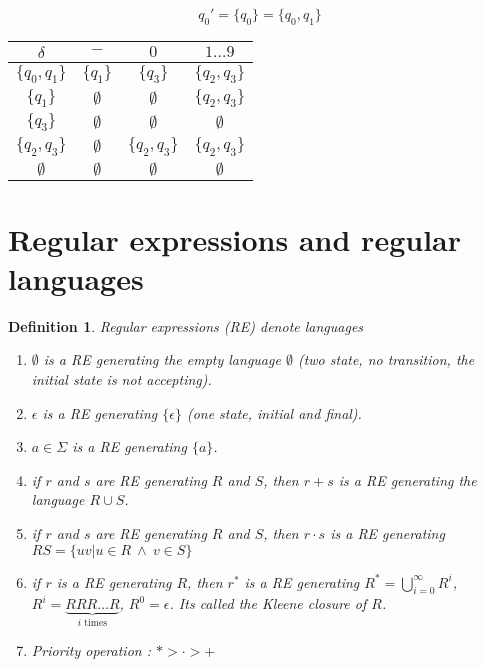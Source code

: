 \documentclass[a4paper,11pt]{article}
\newtheorem{mydef}{Definition}
\begin{document}
\begin{center}
\end{center}

\[
  q_0' = \{q_0\} = \{q_0,q_1\}
\]

\begin{center}
  \begin{tabular}{c|ccc}
    $\delta$      & $-$         & $0$           & $1 \dots 9$   \\ \hline
    $\{q_0,q_1\}$ & $\{q_1\}$   & $\{q_3\}$     & $\{q_2,q_3\}$ \\
    $\{q_1\}$     & $\emptyset$ & $\emptyset$   & $\{q_2,q_3\}$ \\
    $\{q_3\}$     & $\emptyset$ & $\emptyset$   & $\emptyset$   \\
    $\{q_2,q_3\}$ & $\emptyset$ & $\{q_2,q_3\}$ & $\{q_2,q_3\}$ \\
    $\emptyset$   & $\emptyset$ & $\emptyset$   & $\emptyset$  
  \end{tabular}
\end{center}

\section{Regular expressions and regular languages}

\begin{mydef}
  Regular expressions (RE) denote languages
  \begin{enumerate}
  \item $\emptyset$ is a RE generating the empty language $\emptyset$ (two
    state, no transition, the initial state is not accepting).
  \item $\epsilon$ is a RE generating $\{\epsilon\}$ (one state, initial and final).
  \item $a \in \Sigma$ is a RE generating $\{a\}$.
  \item if $r$ and $s$ are RE generating $R$ and $S$, then $r + s$ is a RE
    generating the language $R \cup S$.
  \item if $r$ and $s$ are RE generating $R$ and $S$, then $r \cdot s$ is a RE
    generating $RS = \{uv | u\in R\ \wedge\ v \in S\}$
  \item if $r$ is a RE generating $R$, then $r^*$ is a RE generating $R^* =
    \bigcup_{i=0}^\infty R^i$, $R^i = \underbrace{RRR\dots R}_{i\text{ times}}$,
    $R^0 = \epsilon$. Its called the Kleene closure of $R$.
  \item Priority operation : $* > \cdot > +$
  \end{enumerate}
\end{mydef}
\end{document}
